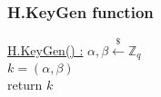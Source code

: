 \subsubsection{H.KeyGen function}
\underline{H.KeyGen() :} 
\tabNormal $\alpha,\beta \xleftarrow[]{\$}\mathbb{Z}_q$ \\
\tabNormal $k = (\alpha,\beta)$ \\
\tabNormal return $k$  \\
